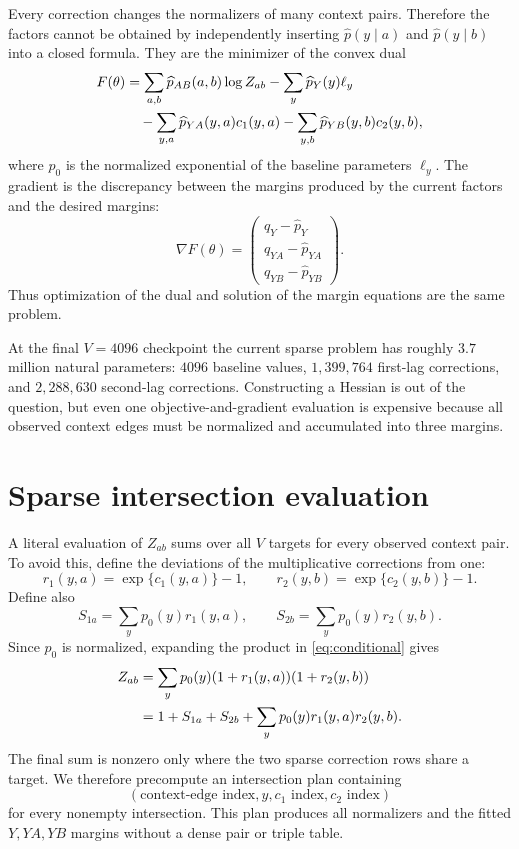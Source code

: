 \documentclass[11pt]{article}
\begin{document}
Every correction changes the normalizers of many context pairs.  Therefore
the factors cannot be obtained by independently inserting
$\widehat p(y\mid a)$ and $\widehat p(y\mid b)$ into a closed formula.
They are the minimizer of the convex dual
\begin{align}
 F(\theta)
 &=\sum_{a,b}\widehat p_{AB}(a,b)\log Z_{ab}
   -\sum_y\widehat p_Y(y)\ell_y \notag\\
 &\quad-\sum_{y,a}\widehat p_{YA}(y,a)c_1(y,a)
       -\sum_{y,b}\widehat p_{YB}(y,b)c_2(y,b),
 \label{eq:dual}
\end{align}
where $p_0$ is the normalized exponential of the baseline parameters
$\ell_y$.  The gradient is the discrepancy between the margins produced
by the current factors and the desired margins:
\[
 \nabla F(\theta)=
 \begin{pmatrix}
  q_Y-\widehat p_Y\\
  q_{YA}-\widehat p_{YA}\\
  q_{YB}-\widehat p_{YB}
 \end{pmatrix}.
\]
Thus optimization of the dual and solution of the margin equations are
the same problem.

At the final $V=4096$ checkpoint the current sparse problem has roughly
$3.7$ million natural parameters: $4096$ baseline values,
$1{,}399{,}764$ first-lag corrections, and $2{,}288{,}630$ second-lag
corrections.  Constructing a Hessian is out of the question, but even one
objective-and-gradient evaluation is expensive because all observed
context edges must be normalized and accumulated into three margins.

\section{Sparse intersection evaluation}

A literal evaluation of $Z_{ab}$ sums over all $V$ targets for every
observed context pair.  To avoid this, define the deviations of the
multiplicative corrections from one:
\begin{equation}
 r_1(y,a)=\exp\{c_1(y,a)\}-1,
 \qquad
 r_2(y,b)=\exp\{c_2(y,b)\}-1.
 \label{eq:r}
\end{equation}
Define also
\begin{equation}
 S_{1a}=\sum_y p_0(y)r_1(y,a),
 \qquad
 S_{2b}=\sum_y p_0(y)r_2(y,b).
 \label{eq:S}
\end{equation}
Since $p_0$ is normalized, expanding the product in
\eqref{eq:conditional} gives
\begin{align}
 Z_{ab}
 &=\sum_y p_0(y)(1+r_1(y,a))(1+r_2(y,b))\notag\\
 &=1+S_{1a}+S_{2b}
   +\sum_y p_0(y)r_1(y,a)r_2(y,b).
 \label{eq:intersection}
\end{align}
The final sum is nonzero only where the two sparse correction rows share
a target.  We therefore precompute an intersection plan containing
\[
 (\text{context-edge index},y,c_1\text{ index},c_2\text{ index})
\]
for every nonempty intersection.  This plan produces all normalizers and
the fitted $Y,YA,YB$ margins without a dense pair or triple table.
\end{document}
